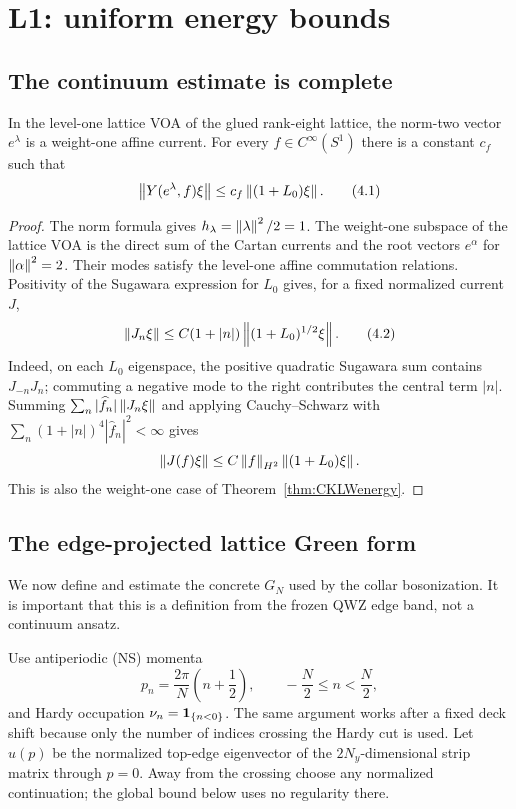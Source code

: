 \section{L1: uniform energy bounds}
\label{sec:L1}

\subsection{The continuum estimate is complete}

\begin{lemma}
\label{lem:continuumEB}
In the level-one lattice VOA of the glued rank-eight lattice, the
norm-two vector $e^\lambda$ is a weight-one affine current.  For every
$f\in C^\infty(S^1)$ there is a constant $c_f$ such that
\[
 \left\lVert Y(e^\lambda,f)\xi\right\rVert
 \le c_f\left\lVert(1+L_0)\xi\right\rVert.
\tag{4.1}\label{eq:continuumEB}
\]
\end{lemma}

\begin{proof}
The norm formula gives $h_\lambda=\left\lVert\lambda\right\rVert^2/2=1$.
The weight-one subspace of the lattice VOA is the direct sum of the
Cartan currents and the root vectors $e^\alpha$ for
$\left\lVert\alpha\right\rVert^2=2$.  Their modes satisfy the level-one affine
commutation relations.  Positivity of the Sugawara expression for $L_0$
gives, for a fixed normalized current $J$,
\[
 \left\lVert J_n\xi\right\rVert
 \le C(1+|n|)\left\lVert(1+L_0)^{1/2}\xi\right\rVert.
\tag{4.2}\label{eq:currentmode}
\]
Indeed, on each $L_0$ eigenspace, the positive quadratic Sugawara sum
contains $J_{-n}J_n$; commuting a negative mode to the right contributes
the central term $|n|$.  Summing
$\sum_n|\widehat f_n|\left\lVert J_n\xi\right\rVert$ and applying Cauchy--Schwarz with
$\sum_n(1+|n|)^4|\widehat f_n|^2<\infty$ gives
\[
 \left\lVert J(f)\xi\right\rVert
 \le C\left\lVert f\right\rVert_{H^2}\left\lVert(1+L_0)\xi\right\rVert.
\]
This is also the weight-one case of
Theorem~\ref{thm:CKLWenergy}.
\end{proof}

\subsection{The edge-projected lattice Green form}

We now define and estimate the concrete $G_N$ used by the collar
bosonization.  It is important that this is a definition from the frozen
QWZ edge band, not a continuum ansatz.

Use antiperiodic (NS) momenta
\[
 p_n=\frac{2\pi}{N}\left(n+\frac12\right),
 \qquad -\frac N2\le n<\frac N2,
\tag{4.3}\label{eq:NSmomenta}
\]
and Hardy occupation $\nu_n=\mathbf 1_{\{n<0\}}$.  The same argument works
after a fixed deck shift because only the number of indices crossing the
Hardy cut is used.  Let $u(p)$ be the normalized top-edge eigenvector of
the $2N_y$-dimensional strip matrix through $p=0$.  Away from the
crossing choose any normalized continuation; the global bound below
uses no regularity there.

